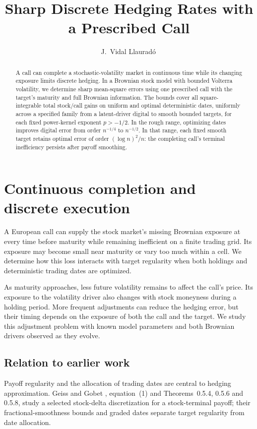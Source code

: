 \documentclass[11pt,a4paper]{amsart}
\title[Sharp discrete hedging rates]{Sharp Discrete Hedging Rates with a Prescribed Call}
\author[J.~Vidal Llaurad\'o]{J.~Vidal Llaurad\'o\,\orcidlink{0009-0002-1918-5458}}
\date{}
\theoremstyle{plain}
\theoremstyle{definition}
\theoremstyle{remark}
\begin{document}
\begin{abstract}
A call can complete a stochastic-volatility market in continuous time while its changing exposure limits discrete hedging. In a Brownian stock model with bounded Volterra volatility, we determine sharp mean-square errors using one prescribed call with the target's maturity and full Brownian information. The bounds cover all square-integrable total stock/call gains on uniform and optimal deterministic dates, uniformly across a specified family from a latent-driver digital to smooth bounded targets, for each fixed power-kernel exponent $p>-1/2$. In the rough range, optimizing dates improves digital error from order $n^{-1/4}$ to $n^{-1/2}$. In that range, each fixed smooth target retains optimal error of order $(\log n)^2/n$: the completing call's terminal inefficiency persists after payoff smoothing.
\end{abstract}
\maketitle

\section{Continuous completion and discrete execution}\label{sec:contract}

A European call can supply the stock market's missing Brownian exposure at every time before maturity while remaining inefficient on a finite trading grid. Its exposure may become small near maturity or vary too much within a cell. We determine how this loss interacts with target regularity when both holdings and deterministic trading dates are optimized.

As maturity approaches, less future volatility remains to affect the call's price. Its exposure to the volatility driver also changes with stock moneyness during a holding period. More frequent adjustments can reduce the hedging error, but their timing depends on the exposure of both the call and the target. We study this adjustment problem with known model parameters and both Brownian drivers observed as they evolve.

\subsection{Relation to earlier work}\label{sec:literature}

Payoff regularity and the allocation of trading dates are central to hedging approximation. Geiss and Gobet \cite{GG2010}, equation~(1) and Theorems~0.5.4, 0.5.6 and 0.5.8, study a selected stock-delta discretization for a stock-terminal payoff; their fractional-smoothness bounds and graded dates separate target regularity from date allocation.
\end{document}
